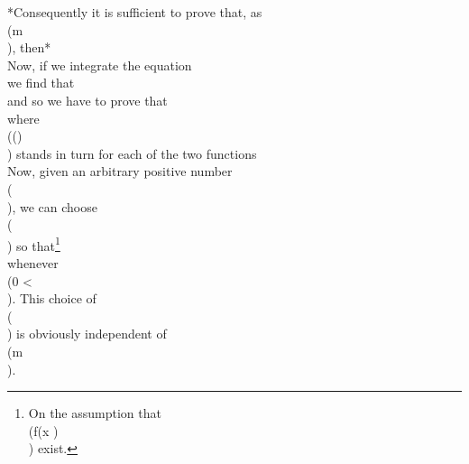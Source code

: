 *Consequently it is sufficient to prove that, as
  \\(m \rightarrow \infty\\), then*
\\[ 
\frac{1}{m}
\! \int_{0}^{\frac{1}{2}\pi}\!
\frac{\sin^{2} m \theta}{\sin^{2} \theta}
f(x + 2\theta)
\, d \theta
\rightarrow
\frac{1}{2} \pi f(x + 0),
\quad
\frac{1}{m}
\! \int_{0}^{\frac{1}{2}\pi}\!
\frac{\sin^{2} m \theta}{\sin^{2} \theta}
f(x - 2\theta)
\, d \theta
\rightarrow
\frac{1}{2} \pi f(x - 0),
\\] 
%
%

Now, if we integrate the equation
\\[ 
\frac{1}{2}
\frac{\sin^{2} m \theta}{\sin^{2} \theta}
=
\frac{1}{2} m + (m-1) \cos 2\theta + \cdots + \cos 2(m-1)\theta,
\\] 
we find that
\\[ 
\int_{0}^{\frac{1}{2} \pi}\!
\frac{\sin^{2} m \theta}{\sin^{2} \theta}
\, d \theta
=
\frac{1}{2} \pi m,
\\] 
and so we have to prove that
\\[ 
\frac{1}{m}
\! \int_{0}^{\frac{1}{2} \pi}\!
\frac{\sin^{2} m \theta}{\sin^{2} \theta}
\phi(\theta)
\, d \theta
\rightarrow
0
\quad
\textrm{as} %
\quad
m \rightarrow \infty
\\] 
where \\(\phi(\theta)\\) stands in turn for each of the two functions
\\[ 
f(x + 2\theta) - f(x + 0),
\quad
f(x - 2\theta) - f(x - 0).
\\] 
Now, given an arbitrary positive number \\(\eps\\), we can choose \\(\delta\\) so
that\footnote{On the assumption that \\(f(x )\\) exist.}
\\[ 
\left| \, \phi(\theta) \, \right|  < \eps
\\] 
whenever \\(0 < \theta \leq {} \delta\\). This choice of \\(\delta\\) is obviously independent of \\(m\\).

